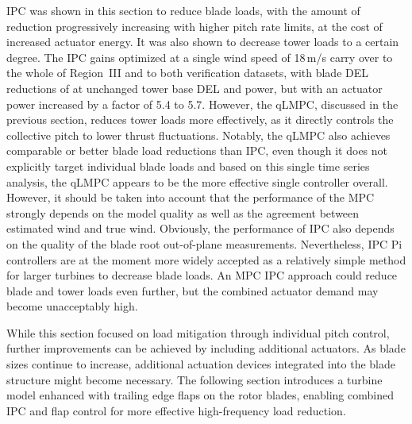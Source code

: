IPC was shown in this section to reduce blade loads, with the amount of reduction progressively increasing with higher pitch rate limits, at the cost of increased actuator energy. It was also shown to decrease tower loads to a certain degree. The IPC gains optimized at a single wind speed of 18\,m/s carry over to the whole of Region~III and to both verification datasets, with blade DEL reductions of  at unchanged tower base DEL and power, but with an actuator power increased by a factor of 5.4 to 5.7. 
However, the qLMPC, discussed in the previous section, reduces tower loads more effectively, as it directly controls the collective pitch to lower thrust fluctuations. Notably, the qLMPC also achieves comparable or 
better blade load reductions than IPC, even though it does not explicitly target 
individual blade loads and based on this single time series analysis, the qLMPC appears to 
be the more effective single controller overall. However, it should be taken into account that the performance of the MPC strongly depends on the model quality as well as the agreement between estimated wind and true wind. Obviously, the performance of IPC also depends on the quality of the blade root out-of-plane measurements. Nevertheless, IPC Pi controllers are at the moment more widely accepted as a relatively simple method for larger turbines to decrease blade loads. An MPC IPC approach could reduce blade and tower loads even further, but the combined actuator demand may become 
unacceptably high.

While this section focused on load mitigation through individual pitch control, further 
improvements can be achieved by including additional actuators. As blade sizes continue to 
increase, additional actuation devices integrated into the blade structure might become 
necessary. The following section introduces a turbine model enhanced 
with trailing edge flaps on the rotor blades, enabling combined IPC and flap control for 
more effective high-frequency load reduction.

